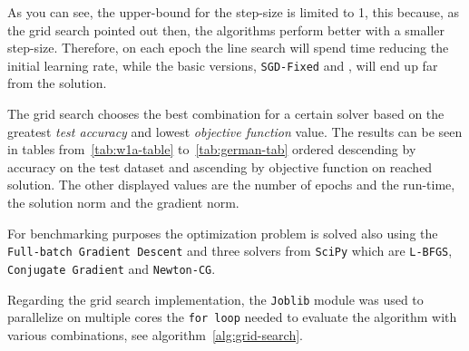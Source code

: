 As you can see, the upper-bound for the step-size is limited to \num{1}, this because, as the grid search pointed out then, the algorithms perform better with a smaller step-size. Therefore, on each epoch the line search will spend time reducing the initial learning rate, while the basic versions, \texttt{SGD-Fixed} and , will end up far from the solution.

The grid search chooses the best combination for a certain solver based on the greatest \emph{test accuracy} and lowest \emph{objective function} value. The results can be seen in tables from~\vref{tab:w1a-table} to~\ref{tab:german-tab} ordered descending by accuracy on the test dataset and ascending by objective function on reached solution. The other displayed values are the number of epochs and the run-time, the solution norm and the gradient norm.

For benchmarking purposes the optimization problem is solved also using the \texttt{Full-batch Gradient Descent} and three solvers from \texttt{SciPy} which are \texttt{L-BFGS}, \texttt{Conjugate Gradient} and \texttt{Newton-CG}.%

Regarding the grid search implementation, the \texttt{Joblib} module was used to parallelize on multiple cores the \texttt{for loop} needed to evaluate the algorithm with various combinations, see algorithm~\vref{alg:grid-search}.\par\smallskip




